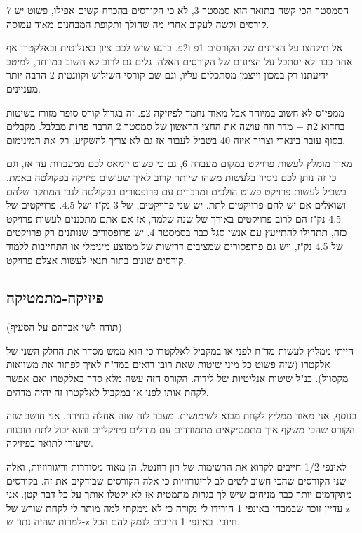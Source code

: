 \documentclass[a4paper,12pt]{article}
\begin{document}
הסמסטר הכי קשה בתואר הוא סמסטר 3, לא כי הקורסים בהכרח קשים אפילו, פשוט יש 7 קורסים וקשה לעקוב אחרי מה שהולך ותקופת המבחנים מאוד עמוסה.

אל תילחצו על הציונים של הקורסים 1פ ו2פ. ברגע שיש לכם ציון באנליטית ובאלקטרו אף אחד כבר לא יסתכל על הציונים של הקורסים האלה. גלים גם לרוב לא חשוב במיוחד, למיטב ידיעתנו רק במכון וייצמן מסתכלים עליו, וגם שם קורסי השילוש וקוונטית 2 הרבה יותר מעניינים.

ממפי"ס לא חשוב במיוחד אבל מאוד נחמד לפיזיקה 2פ. זה בגדול קורס סופר-מזורז בשיטות בחדוא 2ת + מדר וזה עושה את החצי הראשון של סמסטר 2 הרבה פחות מבלבל. מקבלים בסוף עובר בינארי וצריך איזה 40 בשביל לעבור אז גם לא צריך להשקיע, רק את המינימום.

מאוד מומלץ לעשות פרויקט במקום מעבדה 6, גם כי פשוט יימאס לכם ממעבדות עד אז, וגם כי זה נותן לכם ניסיון בלעשות משהו שיותר קרוב לאיך שעושים פיזיקה בפקולטה באמת. בשביל לעשות פרויקט פשוט הולכים ומדברים עם פרופסורים בפקולטה לגבי המחקר שלהם ושואלים אם יש להם פרויקטים לתת. יש שני פרויקטים, של 3 נק"ז ושל 4.5. פרויקטים של 4.5 נק"ז הם לרוב פרויקטים באורך של שנה שלמה, אז אם אתם מתכננים לעשות פרויקט כזה, תתחילו להתייעץ עם אנשי סגל כבר בסמסטר 4. יש פרופסורים שנותנים רק פרויקטים של 4.5 נק"ז, ויש גם פרופסורים שמציבים דרישות של ממוצע מינימלי או התחייבות ללמוד קורסים שונים בתור תנאי לעשות אצלם פרויקט.

\subsection{פיזיקה-מתמטיקה}

(תודה לשי אברהם על הסעיף)

הייתי ממליץ לעשות מד"ח לפני או במקביל לאלקטרו כי הוא ממש מסדר את החלק השני של אלקטרו (שזה פשוט כל מיני שיטות שאת רובן רואים במד"ח לאיך לפתור את משוואות מקסוול). כנ"ל שיטות אנליטיות של לידיה. הקורס הזה עשה מלא סדר באלקטרו ואם אפשר לקחת אותו לפני או במקביל לאלקטרו זה יהיה מדהים.

בנוסף, אני מאוד ממליץ לקחת מבוא לשימושית. מעבר לזה שזה אחלה בחירה, אני חושב שזה הקורס שהכי משקף איך מתמטיקאים מתמודדים עם מודלים פיזיקליים והוא יכול לתת תובנות שיעזרו לתואר בפיזיקה.

לאינפי 1/2 חייבים לקרוא את הרשימות של רון רוזנטל. הן מאוד מסודרות וריגורוזיות, ואלה שני הקורסים שהכי חשוב לשים לב לריגורוזיות כי אלה הקורסים שבודקים את זה. בקורסים מתקדמים יותר כבר מניחים שיש לך בגרות מתמטית אז לא יקטלו אותך על כל דבר קטן. אני עדיין זוכר שבמבחן באינפי 1 הורידו לי נקודה כי לא נימקתי למה מותר לי לקחת שורש של z למרות שהיה נתון ש-z חיובי. באינפי 1 חייבים לנמק להם הכל.
\end{document}
